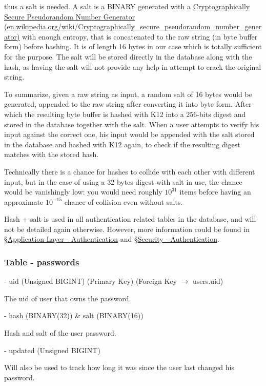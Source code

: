 \documentclass[12pt]{report}
\newcommand{\n}{\par}
\newcommand{\br}{\n\vspace{1 em}\n}
\begin{document}
thus a salt is needed. A salt is a BINARY generated with a
\href{https://en.wikipedia.org/wiki/Cryptographically_secure_pseudorandom_number_generator}{Cryptographically Secure Pseudorandom Number Generator (en.wikipedia.org/wiki/Cryptographically\_secure\_\-pseudorandom\_number\_generator)}
with enough entropy, that is concatenated to the raw string (in byte buffer form) before hashing.
It is of length 16 bytes in our case which is totally sufficient for the purpose.
The salt will be stored directly in the database along with the hash,
as having the salt will not provide any help in attempt to crack the original string.\n
To summarize, given a raw string as input, a random salt of 16 bytes would be generated,
appended to the raw string after converting it into byte form.
After which the resulting byte buffer is hashed with K12 into a 256-bits digest and stored in the database together with the salt.
When a user attempts to verify his input against the correct one,
his input would be appended with the salt stored in the database and hashed with K12 again,
to check if the resulting digest matches with the stored hash.\n
Technically there is a chance for hashes to collide with each other with different input,
but in the case of using a 32 bytes digest with salt in use, the chance would be vanishingly low:
you would need roughly $10^{31}$ items before having an approximate $10^{-15}$ chance of collision even without salts.\n
Hash + salt is used in all authentication related tables in the database, and will not be detailed again otherwise.
However, more information could be found in
\S \hyperref[application-layer.implementation.authentication]{Application Layer - Authentication} and
\S \hyperref[security.authentication]{Security - Authentication}.

\subsubsection{Table - passwords} \label{data-layer.design.user-system.passwords}
\br
- uid (Unsigned BIGINT) (Primary Key) (Foreign Key $\rightarrow$ users.uid)\n
The uid of user that owns the password.
\br
- hash (BINARY(32)) \& salt (BINARY(16))\n
Hash and salt of the user password.
\br
- updated (Unsigned BIGINT)\n
Will also be used to track how long it was since the user last changed his password.
\end{document}
